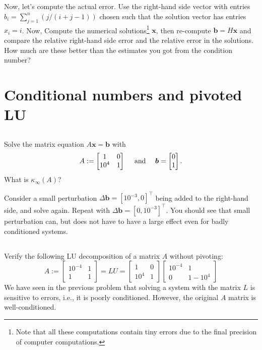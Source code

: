 \documentclass[11pt,letterpaper]{report}
\begin{document}
\subsection{}
  Now, let's compute the actual error. Use the right-hand side vector
  with entries $b_i = \sum_{j=1}^n(j/(i+j-1))$ chosen such that the
  solution vector has entries $x_i=i$. Now, Compute the numerical
  solutions\footnote{Note that all these computations contain tiny
    errors due to the final precision of computer computations.}
  $\boldsymbol x$, then re-compute $\boldsymbol b=H\boldsymbol x$ and
  compare the relative right-hand side error and the relative error
  in the solutions. How much are these better than the estimates you
  got from the condition number?
  
\section{Conditional numbers and pivoted LU}
\subsection{}
Solve the matrix equation $A\boldsymbol x = \boldsymbol b$ with 
\begin{align*}
  A:=
  \begin{bmatrix}
    1       & 0  \\
    10^{4}  & 1
  \end{bmatrix}
  \quad \mbox{ and } \quad
  \boldsymbol b = \begin{bmatrix}
  0\\1
  \end{bmatrix}.
\end{align*}
What is $\kappa_\infty(A)$?

Consider a small perturbation $\Delta \boldsymbol b=[10^{-3},0]^\top$ being added to the right-hand side, and solve again. Repeat with $\Delta \boldsymbol b =[0,10^{-3}]^\top$. You should see that small perturbation can, but does not have to have a large effect even for badly conditioned systems.

\subsection{}
Verify the following LU decomposition of a matrix $A$ without pivoting:
  $$
  A := \begin{bmatrix} 10^{-4} & 1\\ 1 & 1
  \end{bmatrix} = LU =
  \begin{bmatrix} 1 & 0\\ 10^4 & 1
  \end{bmatrix}
  \begin{bmatrix} 10^{-4} & 1\\ 0 & 1-10^4
  \end{bmatrix}
  $$ 
We have seen in the previous problem that solving a system with the matrix $L$ is sensitive to errors, i.e., it is poorly conditioned. However, the original $A$ matrix is well-conditioned.
\end{document}
